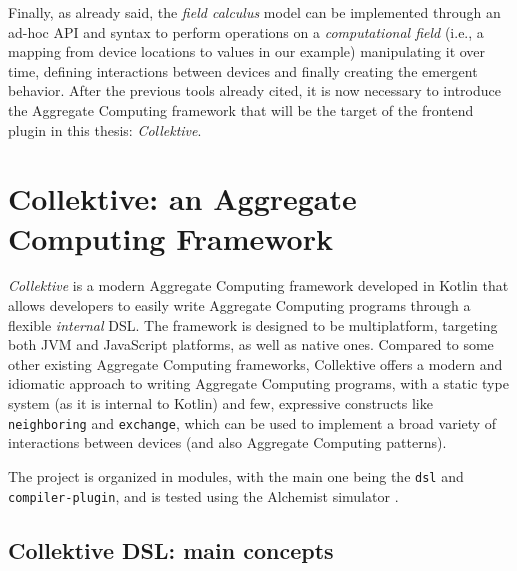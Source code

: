 \documentclass[12pt,a4paper,openright,twoside]{book}
\begin{document}
Finally, as already said, the \emph{field calculus} model can be implemented
through an ad-hoc API and syntax to perform operations on a \emph{computational
field} (i.e., a mapping from device locations to values in our example)
manipulating it over time, defining interactions between devices and finally
creating the emergent behavior.
%
After the previous tools already cited, it is now necessary to
introduce the Aggregate Computing framework that will be the target of the
frontend plugin in this thesis: \emph{Collektive}.

\section{Collektive: an Aggregate Computing Framework}

\emph{Collektive} is a modern Aggregate Computing framework developed in Kotlin 
that allows developers to easily write Aggregate Computing programs through a 
flexible \emph{internal} DSL. The framework is designed to be multiplatform,
targeting both JVM and JavaScript platforms, as well as native ones. 
%
Compared to some other existing Aggregate Computing frameworks, Collektive
offers a modern and idiomatic approach to writing Aggregate Computing programs,
with a static type system (as it is internal to Kotlin) and few, expressive
constructs like \lstinline{neighboring} and \lstinline{exchange}, which can be
used to implement a broad variety of interactions between devices (and also
Aggregate Computing patterns).

The project is organized in modules, with the main one being the \lstinline{dsl}
and \lstinline{compiler-plugin}, and is tested using the Alchemist simulator
\cite{DBLP:journals/jos/PianiniMV13}. 

\subsection{Collektive DSL: main concepts}
\end{document}
